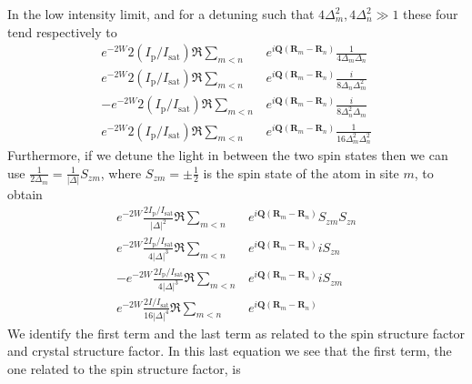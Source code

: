 \documentclass[11pt,letter]{article}
\newcommand{\bv}[1]{\ensuremath{\bm{#1}}}
\begin{document}
In the low intensity limit, and for a detuning such that $4\Delta_{m}^{2}, 4\Delta_{n}^{2} \gg 1 $ these four tend respectively to 
\begin{align} 
    e^{-2W} 2(I_{\mathrm{p}}/I_{\mathrm{sat}}) \Re \sum_{m<n} & 
      e^{ i \bv{Q}( \bv{R}_{m} - \bv{R}_{n} ) } 
      \frac{1}{ 4 \Delta_{m} \Delta_{n} }  \\
    e^{-2W} 2(I_{\mathrm{p}}/I_{\mathrm{sat}}) \Re \sum_{m<n} & 
      e^{ i \bv{Q}( \bv{R}_{m} - \bv{R}_{n} ) } 
      \frac{i}{ 8 \Delta_{n} \Delta_{m}^{2}} \\
  - e^{-2W} 2(I_{\mathrm{p}}/I_{\mathrm{sat}}) \Re \sum_{m<n} & 
      e^{ i \bv{Q}( \bv{R}_{m} - \bv{R}_{n} ) } 
      \frac{i}{ 8 \Delta_{n}^{2} \Delta_{m} } \\
    e^{-2W} 2(I_{\mathrm{p}}/I_{\mathrm{sat}}) \Re \sum_{m<n} & 
      e^{ i \bv{Q}( \bv{R}_{m} - \bv{R}_{n} ) } 
      \frac{1}{ 16 \Delta_{m}^{2} \Delta_{n}^{2} }
\end{align}
Furthermore, if we detune the light in between the two spin states then we can
use $\frac{1}{2\Delta_{m}} = \frac{1}{|\Delta|}S_{zm}$, where
$S_{zm}=\pm\frac{1}{2}$ is the spin state of the atom in site $m$, to obtain
\begin{align} 
    e^{-2W} \frac{2I_{\mathrm{p}}/I_{\mathrm{sat}}}{ |\Delta|^{2} }  \Re \sum_{m<n} & 
      e^{ i \bv{Q}( \bv{R}_{m} - \bv{R}_{n} ) } 
      S_{zm}S_{zn}  \\
    e^{-2W} \frac{2I_{\mathrm{p}}/I_{\mathrm{sat}}}{ 4 |\Delta|^{3} }  \Re \sum_{m<n} & 
      e^{ i \bv{Q}( \bv{R}_{m} - \bv{R}_{n} ) } 
       i S_{zn} \\
  - e^{-2W} \frac{2I_{\mathrm{p}}/I_{\mathrm{sat}}}{ 4 |\Delta|^{3} }  \Re \sum_{m<n} & 
      e^{ i \bv{Q}( \bv{R}_{m} - \bv{R}_{n} ) }
       i S_{zm} \\  
    e^{-2W} \frac{2I/I_{\mathrm{sat}}}{ 16 |\Delta|^{4} }  \Re \sum_{m<n} & 
      e^{ i \bv{Q}( \bv{R}_{m} - \bv{R}_{n} ) } 
\end{align}
We identify the first term and the last term as related to the spin structure factor and crystal structure factor.
In this last equation we see that the first term, the one related to the spin structure factor, is
\end{document}
